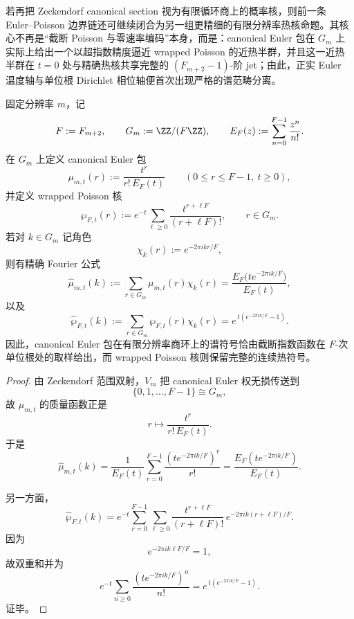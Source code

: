 若再把 Zeckendorf canonical section 视为有限循环商上的概率核，则前一条 Euler--Poisson 边界链还可继续闭合为另一组更精细的有限分辨率热核命题。其核心不再是“截断 Poisson 与零速率编码”本身，而是：canonical Euler 包在 \(G_m\) 上实际上给出一个以超指数精度逼近 wrapped Poisson 的近热半群，并且这一近热半群在 \(t=0\) 处与精确热核共享完整的 \((F_{m+2}-1)\)-阶 jet；由此，正实 Euler 温度轴与单位根 Dirichlet 相位轴便首次出现严格的谱范畴分离。

\begin{theorem}\label{thm:conclusion-zeckendorf-euler-wrapped-poisson-fourier}
固定分辨率 \(m\)，记
\[
F:=F_{m+2},
\qquad
G_m:=\ZZ/(F\ZZ),
\qquad
E_F(z):=\sum_{n=0}^{F-1}\frac{z^n}{n!}.
\]
在 \(G_m\) 上定义 canonical Euler 包
\[
\mu_{m,t}(r):=\frac{t^r}{r!\,E_F(t)}
\qquad (0\le r\le F-1,\ t\ge 0),
\]
并定义 wrapped Poisson 核
\[
\wp_{F,t}(r):=e^{-t}\sum_{\ell\ge 0}\frac{t^{r+\ell F}}{(r+\ell F)!},
\qquad
r\in G_m.
\]
若对 \(k\in G_m\) 记角色
\[
\chi_k(r):=e^{-2\pi i kr/F},
\]
则有精确 Fourier 公式
\[
\widehat\mu_{m,t}(k)
:=
\sum_{r\in G_m}\mu_{m,t}(r)\chi_k(r)
=
\frac{E_F\!\bigl(te^{-2\pi i k/F}\bigr)}{E_F(t)},
\]
以及
\[
\widehat\wp_{F,t}(k)
:=
\sum_{r\in G_m}\wp_{F,t}(r)\chi_k(r)
=
e^{\,t(e^{-2\pi i k/F}-1)}.
\]
因此，canonical Euler 包在有限分辨率商环上的谱符号恰由截断指数函数在 \(F\)-次单位根处的取样给出，而 wrapped Poisson 核则保留完整的连续热符号。
\end{theorem}
\begin{proof}
由 Zeckendorf 范围双射，\(V_m\) 把 canonical Euler 权无损传送到
\[
\{0,1,\dots,F-1\}\cong G_m,
\]
故 \(\mu_{m,t}\) 的质量函数正是
\[
r\longmapsto \frac{t^r}{r!\,E_F(t)}.
\]
于是
\[
\widehat\mu_{m,t}(k)
=
\frac{1}{E_F(t)}\sum_{r=0}^{F-1}\frac{(te^{-2\pi i k/F})^r}{r!}
=
\frac{E_F(te^{-2\pi i k/F})}{E_F(t)}.
\]

另一方面，
\[
\widehat\wp_{F,t}(k)
=
e^{-t}\sum_{r=0}^{F-1}\sum_{\ell\ge 0}
\frac{t^{r+\ell F}}{(r+\ell F)!}\,e^{-2\pi i k(r+\ell F)/F}.
\]
因为
\[
e^{-2\pi i k\ell F/F}=1,
\]
故双重和并为
\[
e^{-t}\sum_{n\ge 0}\frac{(te^{-2\pi i k/F})^n}{n!}
=
e^{\,t(e^{-2\pi i k/F}-1)}.
\]
证毕。
\end{proof}

